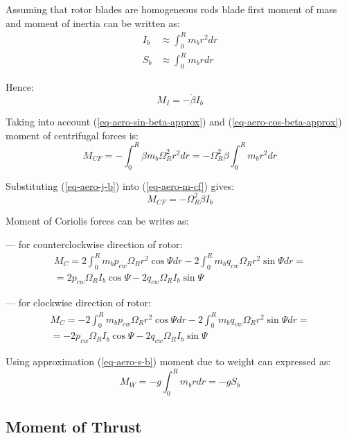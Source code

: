 Assuming that rotor blades are homogeneous rods blade first moment of mass and moment of inertia can be written as: \cite{NASA-TT-F-494}
\begin{align}
  \label{eq-aero-j-b}
  I_b &\approx \int_{0}^{R} m_b r^2 dr \\
  \label{eq-aero-s-b}
  S_b &\approx \int_{0}^{R} m_b r dr
\end{align}

Hence:
\begin{equation}
  M_I = - \ddot \beta I_b
\end{equation}

Taking into account (\ref{eq-aero-sin-beta-approx}) and (\ref{eq-aero-cos-beta-approx}) moment of centrifugal forces is:
\begin{equation}
  \label{eq-aero-m-cf}
  M_{CF} =
  - \int_{0}^{R} \beta m_b \Omega_R^2 r^2 dr =
  - \Omega_R^2 \beta \int_{0}^{R} m_b r^2 dr
\end{equation}

Substituting (\ref{eq-aero-j-b}) into (\ref{eq-aero-m-cf}) gives:
\begin{equation}
  M_{CF} = - \Omega_R^2 \beta I_b
\end{equation}

Moment of Coriolis forces can be writes as:

--- for counterclockwise direction of rotor:
\begin{multline}
  M_C =
    2 \int_{0}^{R} m_b p_{cw} \Omega_R r^2 \cos \Psi dr
  - 2 \int_{0}^{R} m_b q_{cw} \Omega_R r^2 \sin \Psi dr
  = \\ =
  2 p_{cw} \Omega_R I_b \cos \Psi - 2 q_{cw} \Omega_R I_b \sin \Psi
\end{multline}

--- for clockwise direction of rotor:
\begin{multline}
  M_C =
  - 2 \int_{0}^{R} m_b p_{cw} \Omega_R r^2 \cos \Psi dr
  - 2 \int_{0}^{R} m_b q_{cw} \Omega_R r^2 \sin \Psi dr
  = \\ =
  -2 p_{cw} \Omega_R I_b \cos \Psi - 2 q_{cw} \Omega_R I_b \sin \Psi
\end{multline}

Using approximation (\ref{eq-aero-s-b}) moment due to weight can expressed as:
\begin{equation}
  M_W = -g \int_{0}^{R} m_b r dr = -g S_b
\end{equation}

\subsection{Moment of Thrust}

